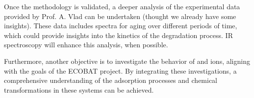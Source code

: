 \documentclass[journal=jpccck,manuscript=article]{achemso}
\begin{document}
Once the methodology is validated, a deeper analysis of the experimental data provided by Prof. A. Vlad can be undertaken (thought we already have some insights). These data includes spectra for aging over different periods of time, which could provide insights into the kinetics of the degradation process. IR spectroscopy will enhance this analysis, when possible.

Furthermore, another objective is to investigate the behavior of  and  ions, aligning with the goals of the ECOBAT project. By integrating these investigations, a comprehensive understanding of the adsorption processes and chemical transformations in these systems can be achieved.


\clearpage

	
\end{document}
